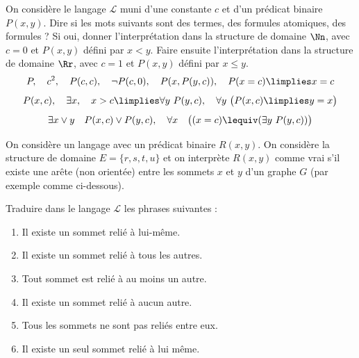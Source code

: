 \documentclass[11pt,class=report,crop=false]{standalone}
\begin{document}
\begin{exercicecours}
On considère le langage $\mathcal{L}$ muni d'une constante $c$ et d'un prédicat binaire $P(x,y)$. Dire si les mots suivants sont des termes, des formules atomiques, des formules ?
Si oui, donner l'interprétation dans la structure de domaine $\Nn$, avec $c=0$ et $P(x,y)$ défini par $x < y$.
Faire ensuite l'interprétation dans la structure de domaine $\Rr$, avec $c=1$ et $P(x,y)$ défini par $x \le y$.
\[
P, \quad c^2, \quad P(c,c), \quad \lnot P(c,0), \quad P(x, P(y,c)), \quad
P(x=c) \limplies x=c 
\]
\[
P(x, c), \quad \exists x, \quad x > c \limplies \forall y \ P(y,c), \quad
\forall y \ \big( P(x,c) \limplies y=x \big)
\]
\[
\exists x \lor y \quad P(x,c) \lor P(y,c), \quad
\forall x \quad \big((x=c) \lequiv (\exists y \ P(y,c))\big)
\] 
\end{exercicecours}


\begin{exercicecours}
On considère un langage avec un prédicat binaire $R(x,y)$.
On considère la structure de domaine $E = \{r,s,t,u\}$ et on interprète $R(x,y)$ comme vrai s'il existe une arête (non orientée) entre les sommets $x$ et $y$ d'un graphe $G$ (par exemple comme ci-dessous). 



Traduire dans le langage $\mathcal{L}$ les phrases suivantes :
\begin{enumerate}
	\item Il existe un sommet relié à lui-même.
	
	\item Il existe un sommet relié à tous les autres.
	
	\item Tout sommet est relié à au moins un autre.
	
	\item Il existe un sommet relié à aucun autre.
	
	\item Tous les sommets ne sont pas reliés entre eux.
	
	\item Il existe un seul sommet relié à lui même.
\end{enumerate}
\end{exercicecours}
\end{document}
